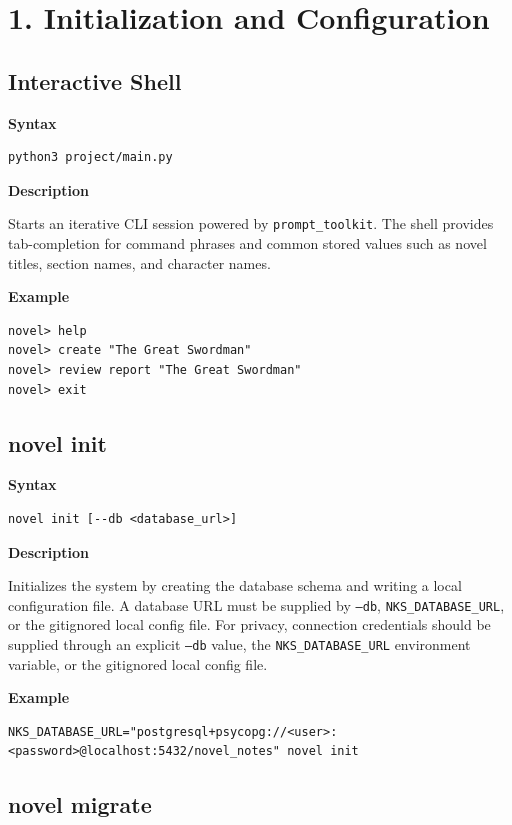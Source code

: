 \documentclass[11pt]{article}
\begin{document}
\section{1. Initialization and Configuration}

\subsection{Interactive Shell}

\textbf{Syntax}
\begin{verbatim}
python3 project/main.py
\end{verbatim}

\textbf{Description}

Starts an iterative CLI session powered by \texttt{prompt\_toolkit}. The shell provides tab-completion for command phrases and common stored values such as novel titles, section names, and character names.

\textbf{Example}
\begin{verbatim}
novel> help
novel> create "The Great Swordman"
novel> review report "The Great Swordman"
novel> exit
\end{verbatim}

\subsection{novel init}

\textbf{Syntax}
\begin{verbatim}
novel init [--db <database_url>]
\end{verbatim}

\textbf{Description}

Initializes the system by creating the database schema and writing a local configuration file. A database URL must be supplied by \texttt{--db}, \texttt{NKS\_DATABASE\_URL}, or the gitignored local config file.
\newline
\newline
For privacy, connection credentials should be supplied through an explicit \texttt{--db} value, the \texttt{NKS\_DATABASE\_URL} environment variable, or the gitignored local config file.

\textbf{Example}
\begin{verbatim}
NKS_DATABASE_URL="postgresql+psycopg://<user>:<password>@localhost:5432/novel_notes" novel init
\end{verbatim}

\subsection{novel migrate}
\end{document}
